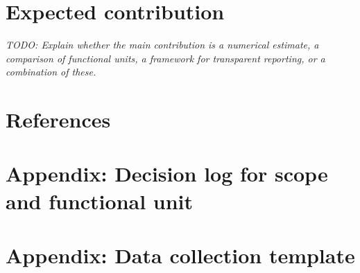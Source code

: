 \documentclass[11pt,a4paper]{article}
\begin{document}
\section{Expected contribution}
\textit{TODO: Explain whether the main contribution is a numerical estimate, a
comparison of functional units, a framework for transparent reporting, or a
combination of these.}

\section{References}
% 
% 

\appendix
\section{Appendix: Decision log for scope and functional unit}

\section{Appendix: Data collection template}
\end{document}
